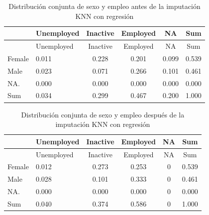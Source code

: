 \documentclass[
  spanish,
  12pt,
]{book}
\newenvironment{Shaded}{\begin{snugshade}}{\end{snugshade}}
\newcommand{\AttributeTok}[1]{\textcolor[rgb]{0.13,0.29,0.53}{#1}}
\newcommand{\FunctionTok}[1]{\textcolor[rgb]{0.13,0.29,0.53}{\textbf{#1}}}
\newcommand{\NormalTok}[1]{#1}
\newcommand{\SpecialCharTok}[1]{\textcolor[rgb]{0.81,0.36,0.00}{\textbf{#1}}}
\newcommand{\StringTok}[1]{\textcolor[rgb]{0.31,0.60,0.02}{#1}}
\begin{document}
\begin{Shaded}
\end{Shaded}

\begin{longtable}[]{@{}llcccc@{}}
\caption{\label{tab:tab-knn-reg-sexo-antes}Distribución conjunta de sexo y empleo antes de la imputación KNN con regresión}\tabularnewline
\toprule\noalign{}
& Unemployed & Inactive & Employed & NA & Sum \\
\midrule\noalign{}
\endfirsthead
\toprule\noalign{}
& Unemployed & Inactive & Employed & NA & Sum \\
\midrule\noalign{}
\endhead
\bottomrule\noalign{}
\endlastfoot
Female & 0.011 & 0.228 & 0.201 & 0.099 & 0.539 \\
Male & 0.023 & 0.071 & 0.266 & 0.101 & 0.461 \\
NA. & 0.000 & 0.000 & 0.000 & 0.000 & 0.000 \\
Sum & 0.034 & 0.299 & 0.467 & 0.200 & 1.000 \\
\end{longtable}

\begin{Shaded}
\end{Shaded}

\begin{longtable}[]{@{}llcccc@{}}
\caption{\label{tab:tab-knn-reg-sexo-despues}Distribución conjunta de sexo y empleo después de la imputación KNN con regresión}\tabularnewline
\toprule\noalign{}
& Unemployed & Inactive & Employed & NA & Sum \\
\midrule\noalign{}
\endfirsthead
\toprule\noalign{}
& Unemployed & Inactive & Employed & NA & Sum \\
\midrule\noalign{}
\endhead
\bottomrule\noalign{}
\endlastfoot
Female & 0.012 & 0.273 & 0.253 & 0 & 0.539 \\
Male & 0.028 & 0.101 & 0.333 & 0 & 0.461 \\
NA. & 0.000 & 0.000 & 0.000 & 0 & 0.000 \\
Sum & 0.040 & 0.374 & 0.586 & 0 & 1.000 \\
\end{longtable}
\end{document}

